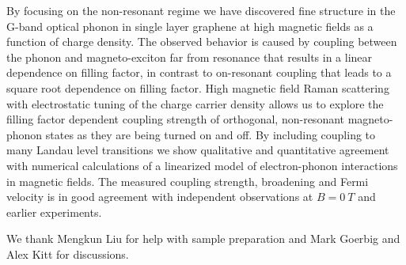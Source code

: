 \documentclass[prl,aps,superscriptaddress,showpacs,reprint]{revtex4-1}
\begin{document}
By focusing on the non-resonant regime we have discovered fine structure in the G-band optical phonon in single layer graphene at high magnetic fields as a function of charge density. The observed behavior is caused by coupling between the phonon and magneto-exciton far from resonance that results in a linear dependence on filling factor, in contrast to on-resonant coupling that leads to a square root dependence on filling factor. High magnetic field Raman scattering with electrostatic tuning of the charge carrier density allows us to explore the filling factor dependent coupling strength of orthogonal, non-resonant magneto-phonon states as they are being turned on and off. By including coupling to many Landau level transitions we show qualitative and quantitative agreement with numerical calculations of a linearized model of electron-phonon interactions in magnetic fields. The measured coupling strength, broadening and Fermi velocity is in good agreement with independent observations at $B=0\: T$ and earlier experiments.
\\

\begin{acknowledgments}
We thank Mengkun Liu for help with sample preparation and Mark Goerbig and Alex Kitt for discussions.
\end{acknowledgments}







\end{document}

